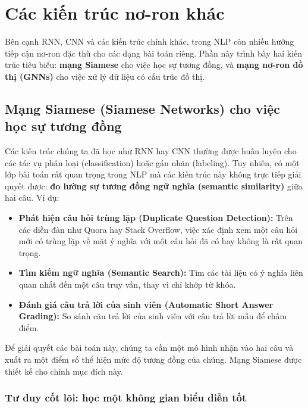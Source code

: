 
\section{Các kiến trúc nơ-ron khác}
\label{sec:other_nn_architectures}

Bên cạnh RNN, CNN và các kiến trúc chính khác, trong NLP còn nhiều hướng tiếp cận nơ-ron đặc thù cho các dạng bài toán riêng. Phần này trình bày hai kiến trúc tiêu biểu: \textbf{mạng Siamese} cho việc học sự tương đồng, và \textbf{mạng nơ-ron đồ thị (GNNs)} cho việc xử lý dữ liệu có cấu trúc đồ thị.

\subsection{Mạng Siamese (Siamese Networks) cho việc học sự tương đồng}
\label{ssec:siamese_networks}

Các kiến trúc chúng ta đã học như RNN hay CNN thường được huấn luyện cho các tác vụ phân loại (classification) hoặc gán nhãn (labeling). Tuy nhiên, có một lớp bài toán rất quan trọng trong NLP mà các kiến trúc này không trực tiếp giải quyết được: \textbf{đo lường sự tương đồng ngữ nghĩa (semantic similarity)} giữa hai câu. Ví dụ:
\begin{itemize}
    \item \textbf{Phát hiện câu hỏi trùng lặp (Duplicate Question Detection):} Trên các diễn đàn như Quora hay Stack Overflow, việc xác định xem một câu hỏi mới có trùng lặp về mặt ý nghĩa với một câu hỏi đã có hay không là rất quan trọng.
    \item \textbf{Tìm kiếm ngữ nghĩa (Semantic Search):} Tìm các tài liệu có ý nghĩa liên quan nhất đến một câu truy vấn, thay vì chỉ khớp từ khóa.
    \item \textbf{Đánh giá câu trả lời của sinh viên (Automatic Short Answer Grading):} So sánh câu trả lời của sinh viên với câu trả lời mẫu để chấm điểm.
\end{itemize}

Để giải quyết các bài toán này, chúng ta cần một mô hình nhận vào hai câu và xuất ra một điểm số thể hiện mức độ tương đồng của chúng. Mạng Siamese \cite{mueller2016siamese} được thiết kế cho chính mục đích này.

\subsubsection{Tư duy cốt lõi: học một không gian biểu diễn tốt}
\label{ssec:siamese_intuition}

